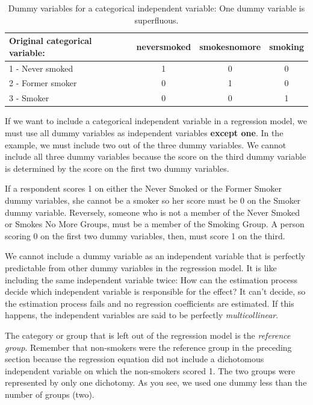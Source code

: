 \documentclass[a4paper]{book}
\theoremstyle{definition}
\theoremstyle{definition}
\theoremstyle{definition}
\theoremstyle{remark}
\begin{document}
\begin{table}[H]

\caption{\label{tab:dummytable}Dummy variables for a categorical independent variable: One dummy variable is superfluous.}
\centering
\fontsize{8}{8}\selectfont
\begin{tabular}[t]{lccc}
\hline
Original categorical variable: & neversmoked & smokesnomore & smoking\\
\hline
1 - Never smoked & 1 & 0 & 0\\
2 - Former smoker & 0 & 1 & 0\\
3 - Smoker & 0 & 0 & 1\\
\hline
\end{tabular}
\end{table}

If we want to include a categorical independent variable in a regression
model, we must use all dummy variables as independent variables
\textbf{except one}. In the example, we must include two out of the
three dummy variables. We cannot include all three dummy variables
because the score on the third dummy variable is determined by the score
on the first two dummy variables.

If a respondent scores 1 on either the Never Smoked or the Former Smoker
dummy variables, she cannot be a smoker so her score must be 0 on the
Smoker dummy variable. Reversely, someone who is not a member of the
Never Smoked or Smokes No More Groups, must be a member of the Smoking
Group. A person scoring 0 on the first two dummy variables, then, must
score 1 on the third.

We cannot include a dummy variable as an independent variable that is
perfectly predictable from other dummy variables in the regression
model. It is like including the same independent variable twice: How can
the estimation process decide which independent variable is responsible
for the effect? It can't decide, so the estimation process fails and no
regression coefficients are estimated. If this happens, the independent
variables are said to be perfectly \emph{multicollinear}.

The category or group that is left out of the regression model is the
\emph{reference group}. Remember that non-smokers were the reference
group in the preceding section because the regression equation did not
include a dichotomous independent variable on which the non-smokers
scored 1. The two groups were represented by only one dichotomy. As you
see, we used one dummy less than the number of groups (two).
\end{document}
